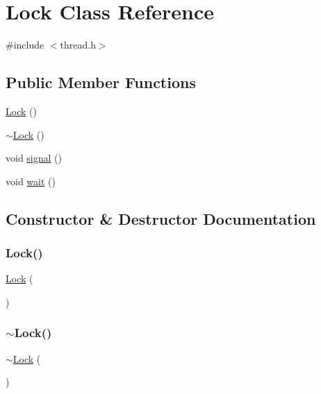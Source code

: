 \hypertarget{classLock}{}\section{Lock Class Reference}
\label{classLock}


{\ttfamily \#include $<$thread.\+h$>$}

\subsection*{Public Member Functions}
\begin{DoxyCompactItemize}
\item 
\mbox{\hyperlink{classLock_a8be1cf6d896d6567f9f287613d6cf934}{Lock}} ()
\item 
\mbox{\hyperlink{classLock_ac83cc649777d71e5d775632548bf4b8a}{$\sim$\+Lock}} ()
\item 
void \mbox{\hyperlink{classLock_a2a0f4bfac2f24aa0a07de86141381aec}{signal}} ()
\item 
void \mbox{\hyperlink{classLock_aa3b21853f890838c88d047d6c2786917}{wait}} ()
\end{DoxyCompactItemize}


\subsection{Constructor \& Destructor Documentation}
\mbox{\label{classLock_a8be1cf6d896d6567f9f287613d6cf934}} 
\subsubsection{\texorpdfstring{Lock()}{Lock()}}
{\footnotesize\ttfamily \mbox{\hyperlink{classLock}{Lock}} (\begin{DoxyParamCaption}{ }\end{DoxyParamCaption})}

\mbox{\label{classLock_ac83cc649777d71e5d775632548bf4b8a}} 
\subsubsection{\texorpdfstring{$\sim$\+Lock()}{~Lock()}}
{\footnotesize\ttfamily $\sim$\mbox{\hyperlink{classLock}{Lock}} (\begin{DoxyParamCaption}{ }\end{DoxyParamCaption})}



